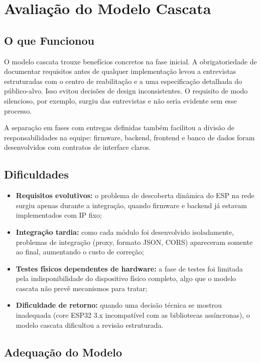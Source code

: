 \documentclass[12pt,a4paper]{article}
\begin{document}
\section{Avaliação do Modelo Cascata}

\subsection{O que Funcionou}

O modelo cascata trouxe benefícios concretos na fase inicial. A obrigatoriedade de documentar requisitos antes de qualquer implementação levou a entrevistas estruturadas com o centro de reabilitação e a uma especificação detalhada do público-alvo. Isso evitou decisões de design inconsistentes. O requisito de modo silencioso, por exemplo, surgiu das entrevistas e não seria evidente sem esse processo.

A separação em fases com entregas definidas também facilitou a divisão de responsabilidades na equipe: firmware, backend, frontend e banco de dados foram desenvolvidos com contratos de interface claros.

\subsection{Dificuldades}

\begin{itemize}
    \item \textbf{Requisitos evolutivos:} o problema de descoberta dinâmica do ESP na rede surgiu apenas durante a integração, quando firmware e backend já estavam implementados com IP fixo;
    \item \textbf{Integração tardia:} como cada módulo foi desenvolvido isoladamente, problemas de integração (proxy, formato JSON, CORS) apareceram somente ao final, aumentando o custo de correção;
    \item \textbf{Testes físicos dependentes de hardware:} a fase de testes foi limitada pela indisponibilidade do dispositivo físico completo, algo que o modelo cascata não prevê mecanismos para tratar;
    \item \textbf{Dificuldade de retorno:} quando uma decisão técnica se mostrou inadequada (core ESP32 3.x incompatível com as bibliotecas assíncronas), o modelo cascata dificultou a revisão estruturada.
\end{itemize}

\subsection{Adequação do Modelo}
\end{document}

